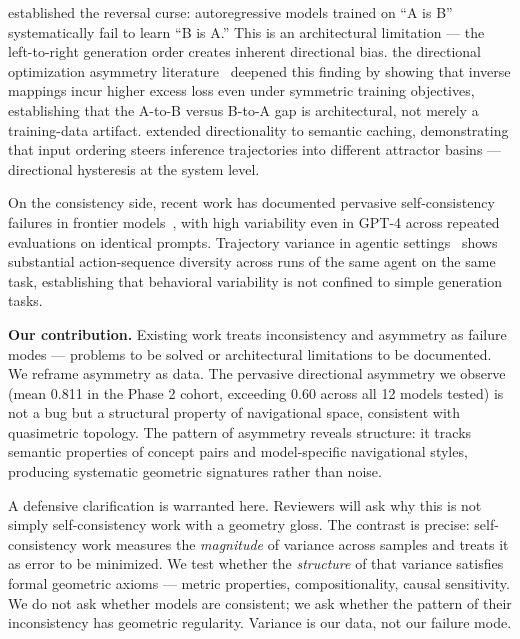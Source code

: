 \citet{berglund2024reversal} established the reversal curse: autoregressive models trained on ``A is B'' systematically fail to learn ``B is A.'' This is an architectural limitation --- the left-to-right generation order creates inherent directional bias. the directional optimization asymmetry literature~\citep{directionalasymmetry2025} deepened this finding by showing that inverse mappings incur higher excess loss even under symmetric training objectives, establishing that the A-to-B versus B-to-A gap is architectural, not merely a training-data artifact. \citet{barakat2026hysteresis} extended directionality to semantic caching, demonstrating that input ordering steers inference trajectories into different attractor basins --- directional hysteresis at the system level.

On the consistency side, recent work has documented pervasive self-consistency failures in frontier models~\citep{selfconsistency2025}, with high variability even in GPT-4 across repeated evaluations on identical prompts. Trajectory variance in agentic settings~\citep{trajectoryvariance2025} shows substantial action-sequence diversity across runs of the same agent on the same task, establishing that behavioral variability is not confined to simple generation tasks.

\textbf{Our contribution.} Existing work treats inconsistency and asymmetry as failure modes --- problems to be solved or architectural limitations to be documented. We reframe asymmetry as data. The pervasive directional asymmetry we observe (mean 0.811 in the Phase 2 cohort, exceeding 0.60 across all 12 models tested) is not a bug but a structural property of navigational space, consistent with quasimetric topology. The pattern of asymmetry reveals structure: it tracks semantic properties of concept pairs and model-specific navigational styles, producing systematic geometric signatures rather than noise.

A defensive clarification is warranted here. Reviewers will ask why this is not simply self-consistency work with a geometry gloss. The contrast is precise: self-consistency work measures the \emph{magnitude} of variance across samples and treats it as error to be minimized. We test whether the \emph{structure} of that variance satisfies formal geometric axioms --- metric properties, compositionality, causal sensitivity. We do not ask whether models are consistent; we ask whether the pattern of their inconsistency has geometric regularity. Variance is our data, not our failure mode.

